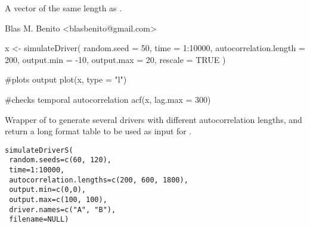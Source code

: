 \documentclass[letterpaper]{book}
\begin{document}
%
\begin{Value}
A vector of the same length as .
\end{Value}
%
\begin{Author}\relax
Blas M. Benito  <blasbenito@gmail.com>
\end{Author}
%
\begin{SeeAlso}\relax
{}
\end{SeeAlso}
%
\begin{Examples}
\begin{ExampleCode}

x <- simulateDriver(
  random.seed = 50,
  time = 1:10000,
  autocorrelation.length = 200,
  output.min = -10,
  output.max = 20,
  rescale = TRUE
  )

#plots output
plot(x, type = "l")

#checks temporal autocorrelation
acf(x, lag.max = 300)

\end{ExampleCode}
\end{Examples}
%
\begin{Description}\relax
Wrapper of  to generate several drivers with different autocorrelation lengths, and return a long format table to be used as input for .
\end{Description}
%
\begin{Usage}
\begin{verbatim}
simulateDriverS(
 random.seeds=c(60, 120),
 time=1:10000,
 autocorrelation.lengths=c(200, 600, 1800),
 output.min=c(0,0),
 output.max=c(100, 100),
 driver.names=c("A", "B"),
 filename=NULL)
\end{verbatim}
\end{Usage}
%
\end{document}

